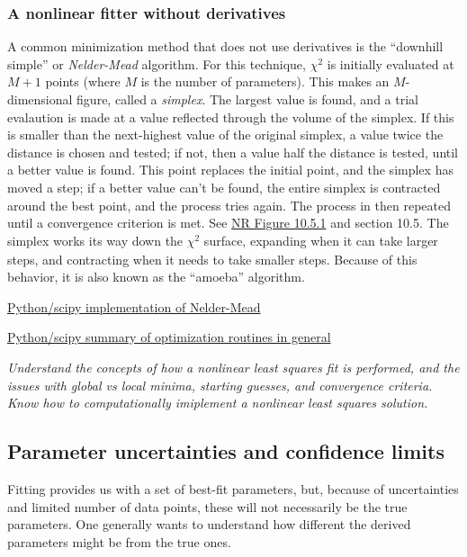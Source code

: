 \documentclass[12pt]{article}
\begin{document}
\subsubsection{A nonlinear fitter without derivatives}
A common minimization method that does not use derivatives is the
``downhill simple'' or \emph{Nelder-Mead} algorithm.
For this technique, $\chi^{2}$ is initially evaluated at $M+1$ points
(where $M$ is the number of parameters).
This makes an $M$-dimensional figure, called a \emph{simplex}.
The largest value is found, and a trial evalaution is made at
a value reflected through the volume of the simplex. If this is
smaller than the next-highest value of the original simplex, a value
twice the distance is chosen and tested; if not, then a value half the
distance is tested, until a better value is found. This point replaces
the initial point, and the simplex has moved a step; if a better value
can't be found, the entire simplex is contracted around the best
point, and the process tries again. The process in then repeated until
a convergence criterion is met. See
\href{}
{NR Figure 10.5.1} and section 10.5.
The simplex works its way down the $ \chi^{2}_{}$ surface, expanding
when it can take larger steps, and contracting when it needs to take
smaller steps. Because of this behavior, it is also known as the
``amoeba'' algorithm.

\href{http://docs.scipy.org/doc/scipy-0.16.0/reference/generated/scipy.optimize.fmin.html}
{Python/scipy implementation of Nelder-Mead}

\href{https://docs.scipy.org/doc/scipy-0.16.1/reference/tutorial/optimize.html}
{Python/scipy summary of optimization routines in general}

\colorbox{hl}{\parbox{0.9\textwidth}
{\emph{Understand the concepts of how a nonlinear least squares fit is
performed, and the issues with global vs local minima,
starting guesses, and convergence criteria. Know how to
computationally imiplement a nonlinear least squares solution.}}}



\subsection{Parameter uncertainties and confidence limits}
Fitting provides us with a set of best-fit parameters, but, because
of uncertainties and limited number of data points, these will not
necessarily be the true parameters. One generally wants to understand
how different the derived parameters might be from the true ones.
\end{document}
